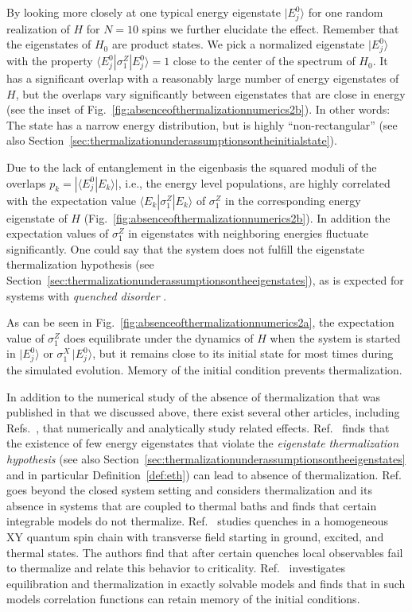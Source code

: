 \documentclass[a4paper,12pt,listof=totoc,index=totoc,bibliography=totoc,headsepline=false,headings=normal,BCOR16.153846mm,DIV12,headinclude,twoside,cleardoublepage=empty,numbers=noenddot,final]{scrreprt}
\theoremstyle{mystyle}
\numberwithin{equation}{section}
\numberwithin{figure}{section}
\numberwithin{lemma}{section}
\numberwithin{theorem}{section}
\numberwithin{corollary}{section}
\numberwithin{definition}{section}
\numberwithin{conjecture}{section}
\numberwithin{observation}{section}
\newcommand{\+}{\mkern2mu}
\renewcommand{\H}{H}
\newcommand{\bra}[1]{\langle #1|}
\newcommand{\ket}[1]{|#1\rangle}
\newcommand{\braket}[2]{\langle #1 | #2 \rangle}
\DeclareMathOperator{\1}{\mathds{1}}
\begin{document}
By looking more closely at one typical energy eigenstate $\ket{E^0_j}$ for one random realization of $\H$ for $N=10$ spins we further elucidate the effect.
Remember that the eigenstates of $\H_0$ are product states.
We pick a normalized eigenstate $\ket{E_j^0}$ with the property $\bra{E^0_j} \sigma^Z_1 \ket{E_j^0} = 1$ close to the center of the spectrum of $\H_0$.
It has a significant overlap with a reasonably large number of energy eigenstates of $\H$, but the overlaps vary significantly between eigenstates that are close in energy (see the inset of Fig.~\ref{fig:absenceofthermalizationnumerics2b}).
In other words: The state has a narrow energy distribution, but is highly ``non-rectangular'' (see also Section~\ref{sec:thermalizationunderassumptionsontheinitialstate}).

Due to the lack of entanglement in the eigenbasis the squared moduli of the overlaps $p_k = |\braket{E^0_j}{E_k}|$, i.e., the energy level populations, are highly correlated with the expectation value $\bra{E_k}\sigma^Z_1\ket{E_k}$ of $\sigma^Z_1$ in the corresponding energy eigenstate of $\H$ (Fig.~\ref{fig:absenceofthermalizationnumerics2b}).
In addition the expectation values of $\sigma^Z_1$ in eigenstates with neighboring energies fluctuate significantly.
One could say that the system does not fulfill the eigenstate thermalization hypothesis (see Section~\ref{sec:thermalizationunderassumptionsontheeigenstates}), as is expected for systems with \emph{quenched disorder} \cite{PhysRevB.82.17}.

As can be seen in Fig.~\ref{fig:absenceofthermalizationnumerics2a}, the expectation value of $\sigma^Z_1$ does equilibrate under the dynamics of $\H$ when the system is started in $\ket{E^0_j}$ or $\sigma^X_1\,\ket{E^0_j}$, but it remains close to its initial state for most times during the simulated evolution. 
Memory of the initial condition prevents thermalization. 

In addition to the numerical study of the absence of thermalization that was published in \cite{PhysRevLett.10-6} that we discussed above, there exist several other articles, including Refs.~\cite{1011.0781v1,Cazalilla11,Biroli09,Znidaric09}, that numerically and analytically study related effects.
Ref.~\cite{Biroli09} finds that the existence of few energy eigenstates that violate the \emph{eigenstate thermalization hypothesis} (see also Section~\ref{sec:thermalizationunderassumptionsontheeigenstates} and in particular Definition~\ref{def:eth}) can lead to absence of thermalization.
Ref.~\cite{Znidaric09} goes beyond the closed system setting and considers thermalization and its absence in systems that are coupled to thermal baths and finds that certain integrable models do not thermalize.
Ref.~\cite{1011.0781v1} studies quenches in a homogeneous XY quantum spin chain with transverse field starting in ground, excited, and thermal states.
The authors find that after certain quenches local observables fail to thermalize and relate this behavior to criticality.
Ref.~\cite{Cazalilla11} investigates equilibration and thermalization in exactly solvable models and finds that in such models correlation functions can retain memory of the initial conditions.
\end{document}
